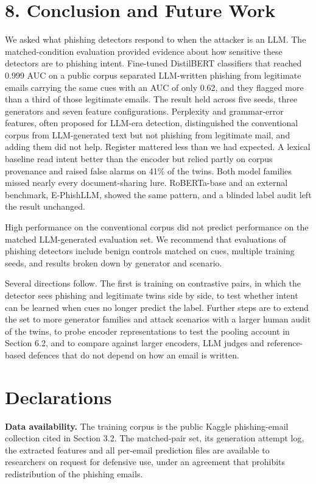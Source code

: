 \documentclass[11pt,letterpaper]{article}
\begin{document}
\section{8. Conclusion and Future Work}

We asked what phishing detectors respond to when the attacker is an LLM. The matched-condition evaluation provided evidence about how sensitive these detectors are to phishing intent. Fine-tuned DistilBERT classifiers that reached 0.999 AUC on a public corpus separated LLM-written phishing from legitimate emails carrying the same cues with an AUC of only 0.62, and they flagged more than a third of those legitimate emails. The result held across five seeds, three generators and seven feature configurations. Perplexity and grammar-error features, often proposed for LLM-era detection, distinguished the conventional corpus from LLM-generated text but not phishing from legitimate mail, and adding them did not help. Register mattered less than we had expected. A lexical baseline read intent better than the encoder but relied partly on corpus provenance and raised false alarms on 41\% of the twins. Both model families missed nearly every document-sharing lure. RoBERTa-base and an external benchmark, E-PhishLLM, showed the same pattern, and a blinded label audit left the result unchanged.

High performance on the conventional corpus did not predict performance on the matched LLM-generated evaluation set. We recommend that evaluations of phishing detectors include benign controls matched on cues, multiple training seeds, and results broken down by generator and scenario.

Several directions follow. The first is training on contrastive pairs, in which the detector sees phishing and legitimate twins side by side, to test whether intent can be learned when cues no longer predict the label. Further steps are to extend the set to more generator families and attack scenarios with a larger human audit of the twins, to probe encoder representations to test the pooling account in Section 6.2, and to compare against larger encoders, LLM judges and reference-based defences that do not depend on how an email is written.

\section{Declarations}

\textbf{Data availability.} The training corpus is the public Kaggle phishing-email collection cited in Section 3.2. The matched-pair set, its generation attempt log, the extracted features and all per-email prediction files are available to researchers on request for defensive use, under an agreement that prohibits redistribution of the phishing emails.
\end{document}

